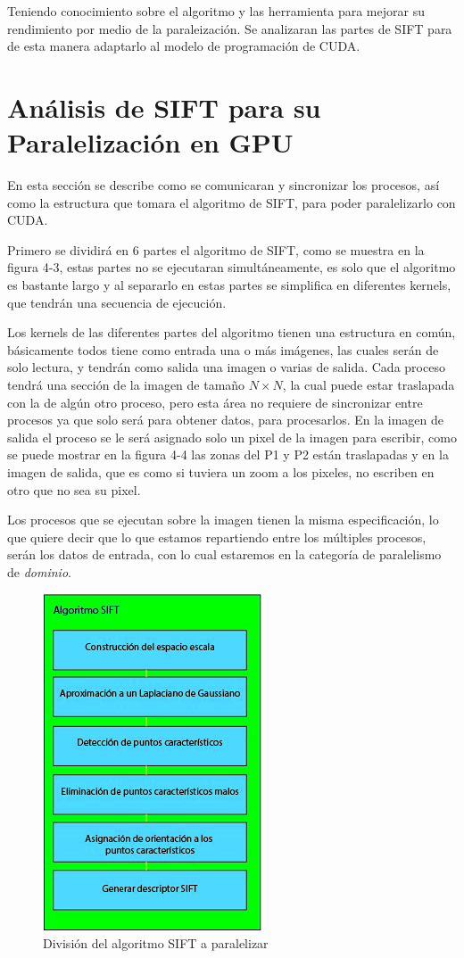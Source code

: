 Teniendo conocimiento sobre el algoritmo y las herramienta para mejorar su rendimiento por medio de la paraleización. Se analizaran las partes de SIFT para de esta manera adaptarlo al modelo de programación de CUDA.
\pagebreak
\section{Análisis de SIFT para su Paralelización en GPU}

En esta sección se describe como se comunicaran y sincronizar los procesos, así como la estructura que tomara el algoritmo de SIFT, para poder paralelizarlo con CUDA. 

Primero se dividirá en 6 partes el algoritmo de SIFT, como se muestra en la figura 4-3, estas partes no se ejecutaran simultáneamente, es solo que el algoritmo es bastante largo y al separarlo en estas partes se simplifica en diferentes kernels, que tendrán una secuencia de ejecución. 


Los kernels de las diferentes partes del algoritmo tienen una estructura en común, básicamente todos tiene como entrada una o más imágenes, las cuales serán de solo lectura, y tendrán como salida una imagen o varias de salida. Cada proceso tendrá una sección de la imagen de tamaño  $N \times N$, la cual puede estar traslapada con la de algún otro proceso, pero esta área no requiere de sincronizar entre procesos ya que solo será para obtener datos, para procesarlos. En la imagen de salida el proceso se le será asignado solo un pixel de la imagen para escribir, como se puede mostrar en la figura 4-4 las zonas del P1 y P2 están traslapadas y en la imagen de salida, que es como si tuviera un zoom a los pixeles, no escriben en otro que no sea su pixel. 

\pagebreak
Los procesos que se ejecutan sobre la imagen tienen la misma especificación, lo que quiere decir que lo que estamos repartiendo entre los múltiples procesos, serán los datos de entrada, con lo cual estaremos en la categoría de paralelismo de \textit{dominio}.

\begin{figure}[ph]
			\centering
				\includegraphics[scale=1]{img/SIFTdiv.jpg}
			\caption{División del algoritmo SIFT a paralelizar}
\end{figure}



